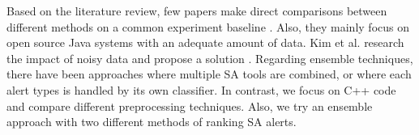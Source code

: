 Based on the literature review, few papers make direct comparisons between different methods on a common experiment baseline \cite{comparative_heckman, compare_framework}. Also, they mainly focus on open source Java systems with an adequate amount of data. Kim et al. \cite{noise_defect} research the impact of noisy data and propose a solution . Regarding ensemble techniques, there have been approaches where multiple SA tools are combined, or where each alert types is handled by its own classifier. In contrast, we focus on C++ code and compare different preprocessing techniques. Also, we try an ensemble approach with two different methods of ranking SA alerts.
